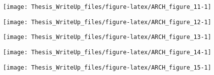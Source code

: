 \documentclass[11pt,preprint, authoryear]{elsarticle}
\let\origfigure\figure
\let\endorigfigure\endfigure
\renewenvironment{figure}[1][2] {
    \expandafter\origfigure\expandafter[H]
} {
    \endorigfigure
}
\numberwithin{equation}{section}
\numberwithin{figure}{section}
\numberwithin{table}{section}
\begin{document}
\begin{figure}[H]

{\centering \texttt{[image: Thesis\_WriteUp\_files/figure-latex/ARCH\_figure\_11-1]}

}

\caption{Autocorrelation and partial-autocorrelation functions of model 4 - GARCH(1,1) -  residuals \label{Figure11}}\label{fig:ARCH_figure_11}
\end{figure}

\begin{figure}[H]

{\centering \texttt{[image: Thesis\_WriteUp\_files/figure-latex/ARCH\_figure\_12-1]}

}

\caption{Autocorrelation and partial-autocorrelation functions of model 5 - EGARCH(1,1) -  residuals \label{Figure12}}\label{fig:ARCH_figure_12}
\end{figure}

\begin{figure}[H]

{\centering \texttt{[image: Thesis\_WriteUp\_files/figure-latex/ARCH\_figure\_13-1]}

}

\caption{Autocorrelation and partial-autocorrelation functions of model 6 - ARMA(1,0) ARCH(1,0) - residuals \label{Figure13}}\label{fig:ARCH_figure_13}
\end{figure}

\begin{figure}[H]

{\centering \texttt{[image: Thesis\_WriteUp\_files/figure-latex/ARCH\_figure\_14-1]}

}

\caption{Autocorrelation and partial-autocorrelation functions of model 7 - ARCH(1,0) - residuals \label{Figure14}}\label{fig:ARCH_figure_14}
\end{figure}

\begin{figure}[H]

{\centering \texttt{[image: Thesis\_WriteUp\_files/figure-latex/ARCH\_figure\_15-1]}

}

\caption{Autocorrelation and partial-autocorrelation functions of model 8 - ARMA(2,0) GARCH(1,1) - residuals \label{Figure15}}\label{fig:ARCH_figure_15}
\end{figure}
\end{document}

